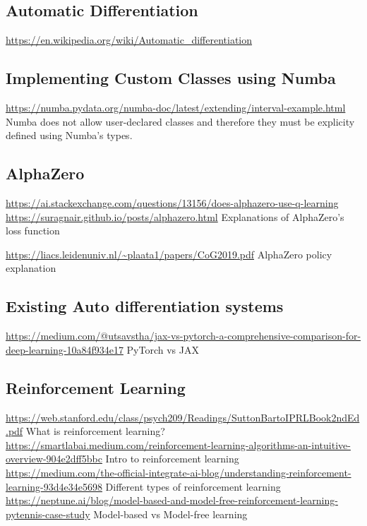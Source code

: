 \documentclass{article}
\begin{document}
    \subsection{Automatic Differentiation}
    \noindent \url{https://en.wikipedia.org/wiki/Automatic_differentiation}

    \subsection{Implementing Custom Classes using Numba}
    \noindent \url{https://numba.pydata.org/numba-doc/latest/extending/interval-example.html}
    Numba does not allow user-declared classes and therefore they must be explicity defined using Numba's types.

    \subsection{AlphaZero}
    \noindent \url{https://ai.stackexchange.com/questions/13156/does-alphazero-use-q-learning}
    \noindent \url{https://suragnair.github.io/posts/alphazero.html}
    Explanations of AlphaZero's loss function

    \noindent \url{https://liacs.leidenuniv.nl/~plaata1/papers/CoG2019.pdf}
    AlphaZero policy explanation

    \subsection{Existing Auto differentiation systems}
    \noindent \url{https://medium.com/@utsavstha/jax-vs-pytorch-a-comprehensive-comparison-for-deep-learning-10a84f934e17}
    PyTorch vs JAX

    \subsection{Reinforcement Learning}
    \noindent \url{https://web.stanford.edu/class/psych209/Readings/SuttonBartoIPRLBook2ndEd.pdf} What is reinforcement learning?\\
    \noindent \url{https://smartlabai.medium.com/reinforcement-learning-algorithms-an-intuitive-overview-904e2dff5bbc} Intro to reinforcement learning\\
    \noindent \url{https://medium.com/the-official-integrate-ai-blog/understanding-reinforcement-learning-93d4e34e5698} Different types of reinforcement learning\\
    \noindent \url{https://neptune.ai/blog/model-based-and-model-free-reinforcement-learning-pytennis-case-study} Model-based vs Model-free learning\\
\end{document}
